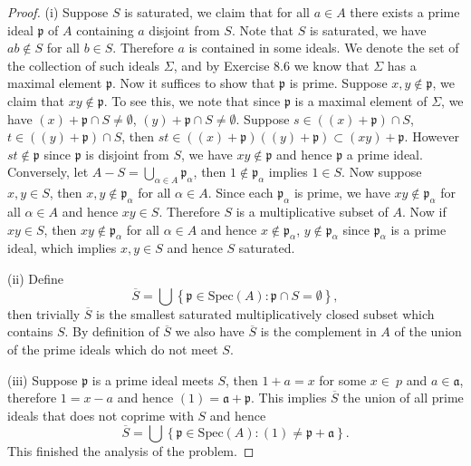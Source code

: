 \begin{proof}
(i) Suppose $S$ is saturated, we claim that for all $a\in A$ there exists a prime ideal $\mathfrak{p}$ of $A$ containing $a$ disjoint from $S$. Note that $S$ is saturated, we have $ab\notin S$ for all $b\in S$. Therefore $a$ is contained in some ideals. We denote the set of the collection of such ideals $\Sigma$, and by Exercise 8.6 we know that $\Sigma$ has a maximal element $\mathfrak{p}$. Now it suffices to show that $\mathfrak{p}$ is prime. Suppose $x,y\notin\mathfrak{p}$, we claim that $xy\notin\mathfrak{p}$. To see this, we note that since $\mathfrak{p}$ is a maximal element of $\Sigma$, we have $(x)+\mathfrak{p}\cap S\ne\emptyset$, $(y)+\mathfrak{p}\cap S\ne\emptyset$. Suppose $s\in ((x)+\mathfrak{p})\cap S$, $t\in ((y)+\mathfrak{p})\cap S$, then $st\in ((x)+\mathfrak{p})((y)+\mathfrak{p})\subset(xy)+\mathfrak{p}$. However $st\notin\mathfrak{p}$ since $\mathfrak{p}$ is disjoint from $S$, we have $xy\notin\mathfrak{p}$ and hence $\mathfrak{p}$ a prime ideal. Conversely, let $A-S=\bigcup_{\alpha\in A}\mathfrak{p}_\alpha$, then $1\notin\mathfrak{p}_\alpha$ implies $1\in S$. Now suppose $x,y\in S$, then $x,y\notin\mathfrak{p}_\alpha$ for all $\alpha\in A$. Since each $\mathfrak{p}_\alpha$ is prime, we have $xy\notin\mathfrak{p}_\alpha$ for all $\alpha\in A$ and hence $xy\in S$. Therefore $S$ is a multiplicative subset of $A$. Now if $xy\in S$, then $xy\notin\mathfrak{p}_\alpha$ for all $\alpha\in A$ and hence $x\notin\mathfrak{p}_\alpha$, $y\notin\mathfrak{p}_\alpha$ since $\mathfrak{p}_\alpha$ is a prime ideal, which implies $x,y\in S$ and hence $S$ saturated.\par
(ii) Define 
$$
\overline{S}=\bigcup{\left\{ \mathfrak{p} \in \mathrm{Spec}\left( A \right) :\mathfrak{p} \cap S=\emptyset \right\}},
$$
then trivially $\overline{S}$ is the smallest saturated multiplicatively closed subset which contains $S$. By definition of $\overline{S}$ we also have $\overline{S}$ is the complement in $A$ of the union of the prime ideals which do not meet $S$.\par
(iii) Suppose $\mathfrak{p}$ is a prime ideal meets $S$, then $1+a=x$ for some $x\in\
{p}$ and $a\in\mathfrak{a}$, therefore $1=x-a$ and hence $(1)=\mathfrak{a}+\mathfrak{p}$. This implies $\overline{S}$ the union of all prime ideals that does not coprime with $S$ and hence 
$$
\overline{S}=\bigcup{\left\{ \mathfrak{p} \in \mathrm{Spec}\left( A \right) :\left( 1 \right) \ne \mathfrak{p} +\mathfrak{a} \right\}}.
$$
This finished the analysis of the problem.
\end{proof}
